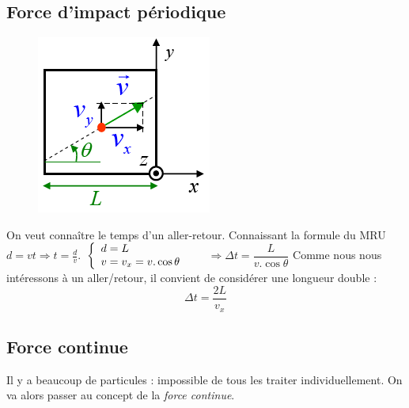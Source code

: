 \documentclass	[11pt, a4paper, openany]{book}
\begin{document}
\subsection{Force d'impact périodique}
\begin{figure}
	\includegraphics[scale=0.4]{th/image7.png}
\end{figure}
On veut connaître le temps d'un aller-retour. Connaissant la formule du MRU $d = vt \Rightarrow t = \frac{d}{v}$.
$\\
\left\{\begin{array}{l}
d = L\\
v = v_x = v.\cos\theta
\end{array}\right.
$ \ \ \ $\Rightarrow \Delta t = \dfrac{L}{v.\cos\theta}$
Comme nous nous intéressons à un aller/retour, il convient de considérer une longueur double :
\begin{equation}
	\Delta t = \frac{2L}{v_x}
\end{equation}
\subsection{Force continue}
Il y a beaucoup de particules : impossible de tous les traiter individuellement. On va alors passer au concept de la \textit{force continue}.
\end{document}
